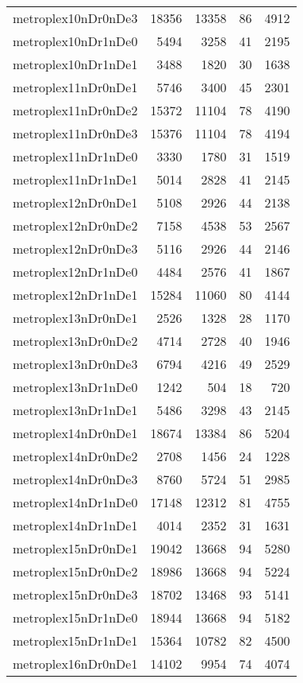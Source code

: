 \begin{longtable}{lrrrr}
metroplex10nDr0nDe3 & 18356 & 13358 & 86 & 4912 \\
metroplex10nDr1nDe0 & 5494 & 3258 & 41 & 2195 \\
metroplex10nDr1nDe1 & 3488 & 1820 & 30 & 1638 \\
metroplex11nDr0nDe1 & 5746 & 3400 & 45 & 2301 \\
metroplex11nDr0nDe2 & 15372 & 11104 & 78 & 4190 \\
metroplex11nDr0nDe3 & 15376 & 11104 & 78 & 4194 \\
metroplex11nDr1nDe0 & 3330 & 1780 & 31 & 1519 \\
metroplex11nDr1nDe1 & 5014 & 2828 & 41 & 2145 \\
metroplex12nDr0nDe1 & 5108 & 2926 & 44 & 2138 \\
metroplex12nDr0nDe2 & 7158 & 4538 & 53 & 2567 \\
metroplex12nDr0nDe3 & 5116 & 2926 & 44 & 2146 \\
metroplex12nDr1nDe0 & 4484 & 2576 & 41 & 1867 \\
metroplex12nDr1nDe1 & 15284 & 11060 & 80 & 4144 \\
metroplex13nDr0nDe1 & 2526 & 1328 & 28 & 1170 \\
metroplex13nDr0nDe2 & 4714 & 2728 & 40 & 1946 \\
metroplex13nDr0nDe3 & 6794 & 4216 & 49 & 2529 \\
metroplex13nDr1nDe0 & 1242 & 504 & 18 & 720 \\
metroplex13nDr1nDe1 & 5486 & 3298 & 43 & 2145 \\
metroplex14nDr0nDe1 & 18674 & 13384 & 86 & 5204 \\
metroplex14nDr0nDe2 & 2708 & 1456 & 24 & 1228 \\
metroplex14nDr0nDe3 & 8760 & 5724 & 51 & 2985 \\
metroplex14nDr1nDe0 & 17148 & 12312 & 81 & 4755 \\
metroplex14nDr1nDe1 & 4014 & 2352 & 31 & 1631 \\
metroplex15nDr0nDe1 & 19042 & 13668 & 94 & 5280 \\
metroplex15nDr0nDe2 & 18986 & 13668 & 94 & 5224 \\
metroplex15nDr0nDe3 & 18702 & 13468 & 93 & 5141 \\
metroplex15nDr1nDe0 & 18944 & 13668 & 94 & 5182 \\
metroplex15nDr1nDe1 & 15364 & 10782 & 82 & 4500 \\
metroplex16nDr0nDe1 & 14102 & 9954 & 74 & 4074 \\

\end{longtable}
